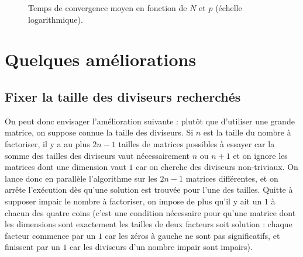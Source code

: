 \documentclass[11pt, openany]{article}
\begin{document}
\begin{figure}
  \centering
  \caption{Temps de convergence moyen en fonction de $N$ et $p$ (échelle logarithmique).}
  \label{fig:p_ag}
\end{figure}  





\section*{Quelques améliorations}

\subsection*{Fixer la taille des diviseurs recherchés}

On peut donc envisager l'amélioration suivante : plutôt que d'utiliser une grande matrice, on suppose connue la taille des diviseurs. Si $n$ est la taille du nombre à factoriser, il y a au plus $2n-1$ tailles de matrices possibles à essayer car la somme des tailles des diviseurs vaut nécessairement $n$ ou $n+1$ et on ignore les matrices dont une dimension vaut $1$ car on cherche des diviseurs non-triviaux. On lance donc en parallèle l'algorithme sur les $2n-1$ matrices différentes, et on arrête l'exécution dès qu'une solution est trouvée pour l'une des tailles. Quitte à supposer impair le nombre à factoriser, on impose de plus qu'il y ait un $1$ à chacun des quatre coins (c'est une condition nécessaire pour qu'une matrice dont les dimensions sont exactement les tailles de deux facteurs soit solution : chaque facteur commence par un $1$ car les zéros à gauche ne sont pas significatifs, et finissent par un $1$ car les diviseurs d'un nombre impair sont impairs). 
\end{document}
